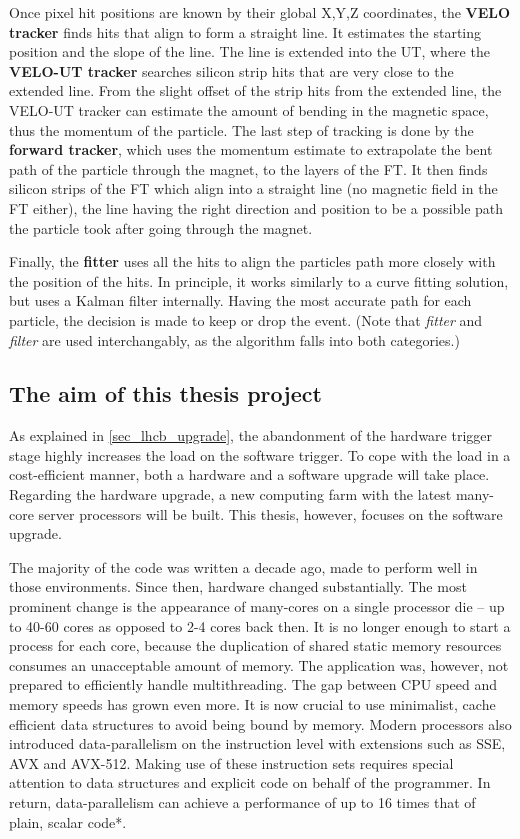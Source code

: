 \documentclass[12pt]{article}
\begin{document}
Once pixel hit positions are known by their global X,Y,Z coordinates, the \textbf{VELO tracker} finds hits that align to form a straight line. It estimates the starting position and the slope of the line. The line is extended into the UT, where the \textbf{VELO-UT tracker} searches silicon strip hits that are very close to the extended line. From the slight offset of the strip hits from the extended line, the VELO-UT tracker can estimate the amount of bending in the magnetic space, thus the momentum of the particle. The last step of tracking is done by the \textbf{forward tracker}, which uses the momentum estimate to extrapolate the bent path of the particle through the magnet, to the layers of the FT. It then finds silicon strips of the FT which align into a straight line (no magnetic field in the FT either), the line having the right direction and position to be a possible path the particle took after going through the magnet.

Finally, the \textbf{fitter} uses all the hits to align the particles path more closely with the position of the hits. In principle, it works similarly to a curve fitting solution, but uses a Kalman filter\cite{kalman_filter_wiki}\cite{kalman_filter_lhcb} internally. Having the most accurate path for each particle, the decision is made to keep or drop the event. (Note that \textit{fitter} and \textit{filter} are used interchangably, as the algorithm falls into both categories.)


\subsection{The aim of this thesis project}

As explained in \ref{sec_lhcb_upgrade}, the abandonment of the hardware trigger stage highly increases the load on the software trigger. To cope with the load in a cost-efficient manner, both a hardware and a software upgrade will take place. Regarding the hardware upgrade, a new computing farm with the latest many-core server processors will be built. This thesis, however, focuses on the software upgrade.

\vspace{1pc}
The majority of the code was written a decade ago, made to perform well in those environments. Since then, hardware changed substantially. The most prominent change is the appearance of many-cores on a single processor die -- up to 40-60 cores as opposed to 2-4 cores back then. It is no longer enough to start a process for each core, because the duplication of shared static memory resources consumes an unacceptable amount of memory. The application was, however, not prepared to efficiently handle multithreading. The gap between CPU speed and memory speeds has grown even more. It is now crucial to use minimalist, cache efficient data structures to avoid being bound by memory. Modern processors also introduced data-parallelism on the instruction level with extensions such as SSE, AVX and AVX-512. Making use of these instruction sets requires special attention to data structures and explicit code on behalf of the programmer. In return, data-parallelism can achieve a performance of up to 16 times that of plain, scalar code*.
\end{document}
